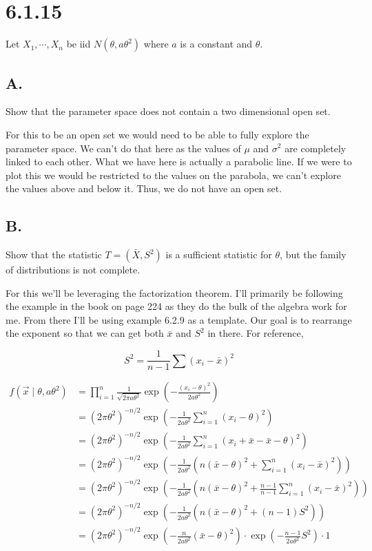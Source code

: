 \section*{6.1.15}

Let $X_1, \cdots, X_n$ be iid $N(\theta, a\theta^2)$ where $a$ is a constant and $\theta$.

\subsection*{A.}

Show that the parameter space does not contain a two dimensional open set.

For this to be an open set we would need to be able to fully explore the parameter space. We can't do that here as the values of $\mu$ and $\sigma^2$ are completely linked to each other. What we have here is actually a parabolic line. If we were to plot this we would be restricted to the values on the parabola, we can't explore the values above and below it. Thus, we do not have an open set.

\subsection*{B.}

Show that the statistic $T = \left( \bar{X}, S^2 \right)$ is a sufficient statistic for $\theta$, but the family of distributions is not complete. 

For this we'll be leveraging the factorization theorem. I'll primarily be following the example in the book on page 224 as they do the bulk of the algebra work for me. From there I'll be using example 6.2.9 as a template. Our goal is to rearrange the exponent so that we can get both $\bar{x}$ and $S^2$ in there. For reference,

\[S^2 = \frac{1}{n-1} \sum (x_i - \bar{x})^2\]

\begin{align*}
	f(\vec{x} \mid \theta, a\theta^2) &= \prod_{i=1}^n \frac{1}{\sqrt{2\pi a\theta^2}} \exp\left( -\frac{(x_i - \theta)^2}{2a\theta^2} \right) \\
	&= (2\pi \theta^2)^{-n/2} \exp\left( -\frac{1}{2a\theta^2} \sum_{i=1}^n (x_i - \theta)^2 \right) \\
	&= (2\pi \theta^2)^{-n/2} \exp\left( -\frac{1}{2a\theta^2} \sum_{i=1}^n (x_i + \bar{x} - \bar{x} - \theta)^2 \right) \\
	&= (2\pi \theta^2)^{-n/2} \exp\left( -\frac{1}{2a\theta^2} \left( n(\bar{x} - \theta)^2 + \sum_{i=1}^n (x_i - \bar{x})^2 \right)  \right) \\
	&= (2\pi \theta^2)^{-n/2} \exp\left( -\frac{1}{2a\theta^2} \left( n(\bar{x} - \theta)^2 + \frac{n-1}{n-1} \sum_{i=1}^n (x_i - \bar{x})^2 \right)  \right) \\
	&= (2\pi \theta^2)^{-n/2} \exp\left( -\frac{1}{2a\theta^2} \left( n(\bar{x} - \theta)^2 + (n-1)S^2 \right)  \right) \\
	&= (2\pi \theta^2)^{-n/2} \exp\left( -\frac{n}{2a\theta^2} (\bar{x} - \theta)^2 \right) \cdot \exp\left( -\frac{n-1}{2a\theta^2} S^2 \right) \cdot 1 
\end{align*}

